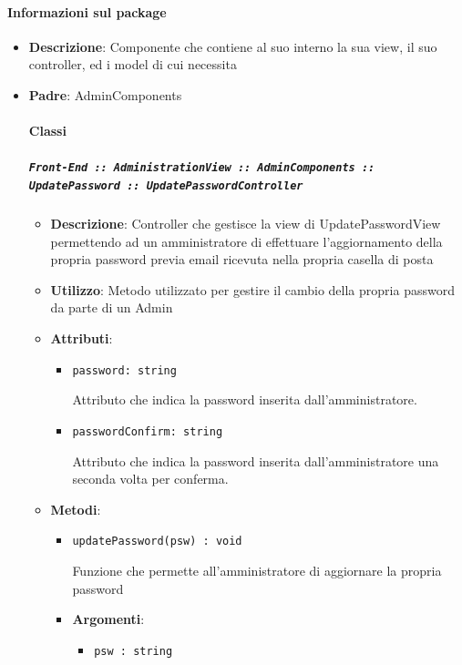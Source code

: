 \documentclass[../DefinizioneDiProdotto.tex]{subfiles}
\begin{document}
	\paragraph{Informazioni sul package}\begin{itemize}\item \textbf{Descrizione}: Componente che contiene al suo interno la sua view, il suo controller, ed i model di cui necessita\item \textbf{Padre}: AdminComponents\paragraph{Classi}
	\subparagraph{\texttt{Front-End :: AdministrationView :: AdminComponents :: UpdatePassword :: UpdatePasswordController}}
	\begin{itemize}\item \textbf{Descrizione}: Controller che gestisce la view di UpdatePasswordView permettendo ad un amministratore di effettuare l'aggiornamento della propria password previa email ricevuta nella propria casella di posta
	\item \textbf{Utilizzo}: Metodo utilizzato per gestire il cambio della propria password da parte di un Admin
	\item \textbf{Attributi}:
	\begin{itemize}
	\item \texttt{password: string}\

	 Attributo che indica la password inserita dall'amministratore.
	\end{itemize}
	\begin{itemize}
	\item \texttt{passwordConfirm: string}\

	 Attributo che indica la password inserita dall'amministratore una seconda volta per conferma.
	\end{itemize}
	\item \textbf{Metodi}:
	\begin{itemize}
	\item \texttt{updatePassword(psw) : void}\

	 Funzione che permette all'amministratore di aggiornare la propria password

	\item \textbf{Argomenti}:
	\begin{itemize}
	\item \texttt{psw : string}\


\end{itemize}
\end{itemize}
\end{itemize}
\end{itemize}
\end{document}

